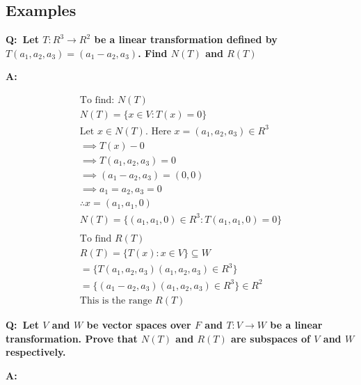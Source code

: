 \documentclass[english,course,fleqn]{lecture}
\newenvironment{qanda}{\setlength{\parindent}{0pt}}{\bigskip}
\newcommand{\Q}{\bigskip\bfseries Q:\ }
\newcommand{\A}{\par\textbf{A:} \normalfont}
\begin{document}
\subsection*{Examples}

\begin{qanda}
  
  \Q Let $T: R^{3} \rightarrow R^{2}$ be a linear transformation defined by $T(a_{1}, a_{2}, a_{3}) = (a_{1} - a_{2}, a_{3})$.
  Find $N(T)$ and $R(T)$

  \A

  \begin{gather*}
    \text{To find: } N(T)\\
    N(T) = \{x \in V: T(x) = 0 \}\\
    \text{Let $x \in N(T)$. Here $x = (a_{1}, a_{2}, a_{3}) \in R^{3}$}\\
    \implies T(x) - 0\\
    \implies T(a_{1}, a_{2}, a_{3}) = 0\\
    \implies (a_{1} - a_{2}, a_{3}) = (0,0)\\
    \implies a_{1} = a_{2}, a_{3} = 0\\
    \therefore x = (a_{1}, a_{1}, 0)\\
    N(T) = \{(a_{1}, a_{1}, 0) \in R^{3}: T(a_{1}, a_{1}, 0) = 0 \}\\
    \\
    \text{To find $R(T)$}\\
    R(T) = \{T(x): x \in V \} \subseteq W\\
    = \{T(a_{1}, a_{2}, a_{3}) (a_{1}, a_{2}, a_{3}) \in R^{3}\}\\
    = \{(a_{1} - a_{2}, a_{3}) (a_{1}, a_{2}, a_{3}) \in R^{3}\}
    \in R^{2}\\
    \text{This is the range $R(T)$}
  \end{gather*}


  \Q Let $V$ and $W$ be vector spaces over $F$ and $T:V\rightarrow W$ be a linear transformation.
  Prove that $N(T)$ and $R(T)$ are subspaces of $V$ and $W$ respectively.

  \A


\end{qanda}
\end{document}
